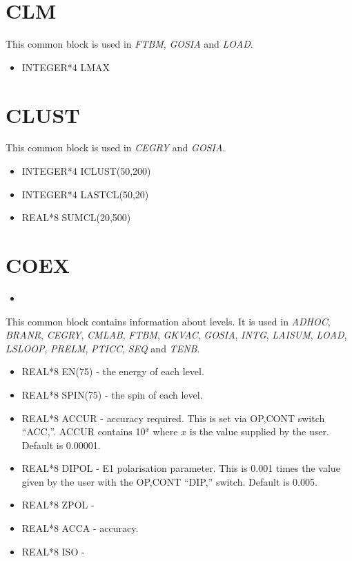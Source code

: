 \section{CLM}

This common block is used in {\em FTBM}, {\em GOSIA} and {\em LOAD}.

\begin{itemize}
\item INTEGER*4 LMAX
\end{itemize}

\section{CLUST}

This common block is used in {\em CEGRY} and {\em GOSIA}.

\begin{itemize}
\item INTEGER*4 ICLUST(50,200)
\item INTEGER*4 LASTCL(50,20)
\item REAL*8 SUMCL(20,500)
\end{itemize}

\section{COEX}

\begin{itemize}
\item 
\end{itemize}

This common block contains information about levels. It is used in {\em
ADHOC}, {\em BRANR}, {\em CEGRY}, {\em CMLAB}, {\em FTBM}, {\em GKVAC}, {\em
GOSIA}, {\em INTG}, {\em LAISUM}, {\em LOAD}, {\em LSLOOP}, {\em PRELM},
{\em PTICC}, {\em SEQ} and {\em TENB}.

\begin{itemize}
\item REAL*8 EN(75) - the energy of each level.
\item REAL*8 SPIN(75) - the spin of each level.
\item REAL*8 ACCUR - accuracy required. This is set via OP,CONT switch
``ACC,''. ACCUR contains 10$^x$ where $x$ is the value supplied by the user.
Default is 0.00001.
\item REAL*8 DIPOL - E1 polarisation parameter. This is 0.001 times the
value given by the user with the OP,CONT ``DIP,'' switch. Default is 0.005.
\item REAL*8 ZPOL - 
\item REAL*8 ACCA - accuracy.
\item REAL*8 ISO -
\end{itemize}

